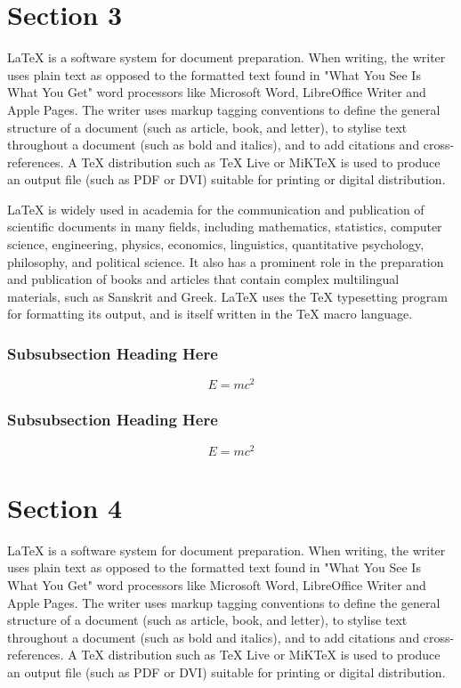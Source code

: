 \documentclass[journal]{Imperial_lab_report}
\begin{document}
\section{Section 3}
LaTeX is a software system for document preparation. When writing, the writer uses plain text as opposed to the formatted text found in "What You See Is What You Get" word processors like Microsoft Word, LibreOffice Writer and Apple Pages. The writer uses markup tagging conventions to define the general structure of a document (such as article, book, and letter), to stylise text throughout a document (such as bold and italics), and to add citations and cross-references. A TeX distribution such as TeX Live or MiKTeX is used to produce an output file (such as PDF or DVI) suitable for printing or digital distribution.

LaTeX is widely used in academia for the communication and publication of scientific documents in many fields, including mathematics, statistics, computer science, engineering, physics, economics, linguistics, quantitative psychology, philosophy, and political science. It also has a prominent role in the preparation and publication of books and articles that contain complex multilingual materials, such as Sanskrit and Greek. LaTeX uses the TeX typesetting program for formatting its output, and is itself written in the TeX macro language.
\subsubsection{Subsubsection Heading Here}
$$ E = mc^2$$
\subsubsection{Subsubsection Heading Here}
$$ E = mc^2$$

\section{Section 4}
LaTeX is a software system for document preparation. When writing, the writer uses plain text as opposed to the formatted text found in "What You See Is What You Get" word processors like Microsoft Word, LibreOffice Writer and Apple Pages. The writer uses markup tagging conventions to define the general structure of a document (such as article, book, and letter), to stylise text throughout a document (such as bold and italics), and to add citations and cross-references. A TeX distribution such as TeX Live or MiKTeX is used to produce an output file (such as PDF or DVI) suitable for printing or digital distribution.
\end{document}
